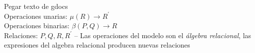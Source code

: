 Pegar texto de gdocs\\
Operaciones unarias: $\mu(R) \rightarrow R^\prime$\\
Operaciones binarias: $\beta(P,Q) \rightarrow R$\\
Relaciones: $P,Q,R,R^\prime$
--
Las operaciones del modelo son el \emph{álgebra relacional}, las expresiones del algebra relacional producen nuevas relaciones